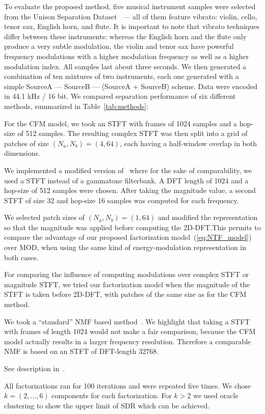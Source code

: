 To evaluate the proposed method, five musical instrument samples were selected from the Unison Separation Dataset~\cite{oss_unison} --- all of them feature vibrato: violin, cello, tenor sax, English horn, and flute. It is important to note that vibrato techniques differ between these instruments: whereas the English horn and the flute only produce a very subtle modulation, the violin and tenor sax have powerful frequency modulations with a higher modulation frequency as well as a higher modulation index. 
All samples last about three seconds. 
We then generated a combination of ten mixtures of two instruments, each one generated with a simple SourceA --- SourceB --- (SourceA + SourceB) scheme. Data were encoded in 44.1 kHz / 16 bit.
We compared separation performance of six different methods, summarized in Table~\ref{tab:methods}:
\begin{description}[style=unboxed,leftmargin=0cm]
\item[CFM] For the CFM model, we took an STFT with frames of 1024 samples and a hop-size of 512 samples. The resulting complex STFT was then split into a grid of patches of size $(N_a, N_b) = (4, 64)$, each having a half-window overlap in both dimensions.
\item[MOD] We implemented a modified version of~\cite{barker13} where for the sake of comparability, we used a STFT instead of a gammatone filterbank. A DFT length of 1024 and a hop-size of 512 samples were chosen. After taking the magnitude value, a second STFT of size 32 and hop-size 16 samples was computed for each frequency.
\item[CFMMOD] We selected patch sizes of $(N_a, N_b) = (1, 64)$ and modified the representation so that the magnitude was applied before computing the 2D-DFT.\@ This permits to compare the advantage of our proposed factorization model~(\ref{eq:NTF_model}) over MOD, when using the same kind of energy-modulation representation in both cases.
\item[CFMM] For comparing the influence of computing modulations over complex STFT or magnitude STFT, we tried our factorization model when the magnitude of the STFT is taken before 2D-DFT, with patches of the same size as for the CFM method.
\item[NMF] We took a ``standard'' NMF based method~\cite{virtanen07}. We highlight that taking a STFT with frames of length 1024 would not make a fair comparison, because the CFM model actually results in a larger frequency resolution. Therefore a comparable NMF is based on an STFT of DFT-length 32768.
\item[HR-NMF] See description in~\cite{magron15a}.
\end{description}
All factorizations ran for 100 iterations and were repeated five times. We chose $k=(2,\ldots,6)$ components for each factorization. For $k > 2$ we used oracle clustering to show the upper limit of SDR which can be achieved.

